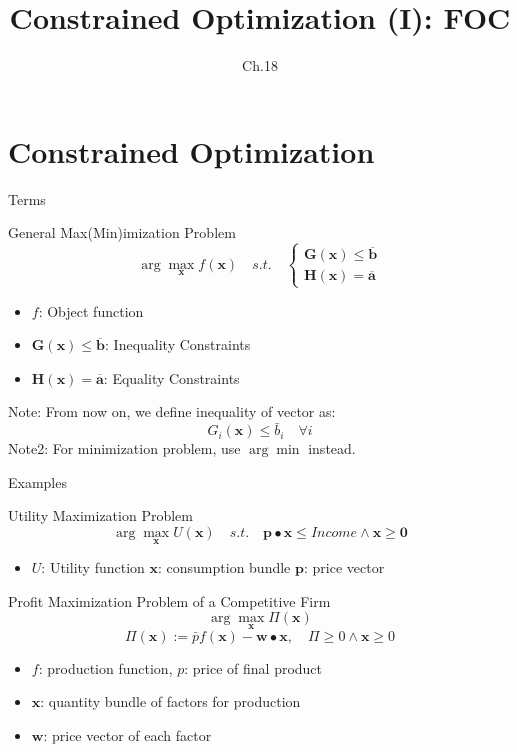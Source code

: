 \documentclass[final]{beamer}
\author[조남운]{\mail}
\title{Constrained Optimization (I): FOC}
\subtitle{Ch.18}
\newcommand{\bd}{\mathbf}
\begin{document}
\maketitle


\section{Constrained Optimization} %
\label{sec:constrained_optimization}
\begin{frame}[t]{Terms}
	\begin{block}
		{General Max(Min)imization Problem}
		\[
			\arg\max_{\bd{x}} f(\bd{x})\quad s.t.\quad \begin{cases}
				\bd{G}(\bd{x})\le\overline{\bd{b}}\\
				\bd{H}(\bd{x})=\overline{\bd{a}}
			\end{cases}
		\]
		\begin{itemize}
			\item $f$: Object function
			\item $\bd{G}(\bd{x})\le\overline{\bd{b}}$: Inequality Constraints
			\item $\bd{H}(\bd{x})=\overline{\bd{a}}$: Equality Constraints
		\end{itemize}
	\end{block}
	Note: From now on, we define inequality of vector as:\[
		G_i(\bd{x}) \le \bar{b}_i\quad \forall i
	\]
	Note2: For minimization problem, use $\arg\min$ instead.
\end{frame}
\begin{frame}[t]{Examples}
	\begin{block}
		{Utility Maximization Problem}
		\[
			\arg\max_{\bd{x}} U(\bd{x})\quad s.t. \quad \bd{p}\bullet \bd{x} \le Income \land \bd{x}\ge \bd{0}
		\]
		\begin{itemize}
			\item $U$: Utility function $\bd{x}$: consumption bundle $\bd{p}$: price vector
		\end{itemize}
	\end{block}
	\begin{block}
		{Profit Maximization Problem of a Competitive Firm}
		\[
			\arg\max_{\bd{x}} \Pi(\bd{x})
		\]\[
			\Pi(\bd{x}) := \bar p f(\bd{x}) - \bd{w}\bullet\bd{x},\quad \Pi\ge 0 \land \bd{x}\ge 0
		\]
		\begin{itemize}
			\item $f$: production function, $p$: price of final product
			\item $\bd{x}$: quantity bundle of factors for production
			\item $\bd{w}$: price vector of each factor
		\end{itemize}
	\end{block}
\end{frame}
\end{document}
